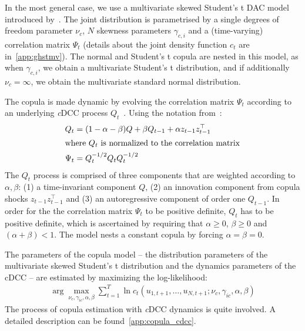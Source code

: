 In the most general case, we use a multivariate skewed Student's t DAC model introduced by~\autocite{ChristoffersenErrunzaJacobLanglois2012}. The joint distribution is parametrised by a single degrees of freedom parameter $\nu_c$, $N$ skewness parameters $\gamma_{c,i}$ and a (time-varying) correlation matrix $\Psi_{t}$ (details about the joint density function $c_t$ are in~\autoref{app:ghstmv}). The normal and Student's t copula are nested in this model, as when $\gamma_{c,i}$, we obtain a multivariate Student's t distribution, and if additionally $\nu_c = \infty$, we obtain the multivariate standard normal distribution.


The copula is made dynamic by evolving the correlation matrix $\Psi_t$ according to an underlying \emph{c}DCC process $Q_t$~\autocites[cf.]{Engle2002,Aielli2013}. Using the notation from~\autocite{ChristoffersenLanglois2013}:
\begin{align}
  Q_t &= (1 - \alpha - \beta) Q
    + \beta Q_{t - 1}
    + \alpha z_{t - 1} z_{t - 1}^\top \\
  \intertext{where $Q_t$ is normalized to the correlation matrix}
  \Psi_t &= Q_t^{-1/2} Q_t Q_t^{-1/2}
\end{align}
The $Q_t$ process is comprised of three components that are weighted according to $\alpha, \beta$: (1) a time-invariant component $Q$, (2) an innovation component from copula shocks $z_{t-1} z_{t-1}^\top$ and (3) an autoregressive component of order one $Q_{t-1}$. In order for the the correlation matrix $\Psi_t$ to be positive definite, $Q_t$ has to be positive definite, which is ascertained by requiring that $\alpha \geq 0$, $\beta \geq 0$ and $(\alpha + \beta) < 1$. The model nests a constant copula by forcing $\alpha = \beta = 0$.


The parameters of the copula model -- the distribution parameters of the multivariate skewed Student's t distribution and the dynamics parameters of the cDCC -- are estimated by maximizing the log-likelihood:
\begin{align}
  \arg\!\max_{\nu_c, \gamma_{ic}, \alpha, \beta} \sum_{t = 1}^T \ln c_t(u_{1, t+1}, \ldots, u_{N, t+1}; \nu_c, \gamma_{ic}, \alpha, \beta)
\end{align}
The process of copula estimation with \emph{c}DCC dynamics is quite involved. A detailed description can be found~\autoref{app:copula_cdcc}.


